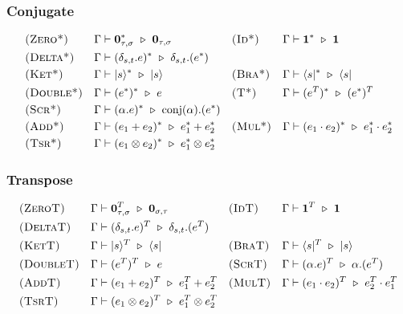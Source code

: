 \subsubsection*{Conjugate}
\begin{align*}
  & \textsc{(Zero*)} && \Gamma \vdash \textbf{0}_{\tau, \sigma}^* \ \triangleright\  \textbf{0}_{\tau, \sigma}
  && \textsc{(Id*)} && \Gamma \vdash \mathbf{1}^* \ \triangleright\  \mathbf{1} \\
  & \textsc{(Delta*)} &&
  \Gamma \vdash (\delta_{s,t}.e)^* \ \triangleright\  \delta_{s,t}.(e^*)\\
  & \textsc{(Ket*)} && \Gamma \vdash |s\rangle^* \ \triangleright\  |s\rangle
  && \textsc{(Bra*)} && \Gamma \vdash \langle s|^* \ \triangleright\  \langle s| \\
  & \textsc{(Double*)} && \Gamma \vdash (e^*)^*\ \triangleright\  e
  && \textsc{(T*)} && \Gamma \vdash (e^T)^* \ \triangleright\ (e^*)^T \\
  & \textsc{(Scr*)} && \Gamma \vdash (\alpha.e)^* \ \triangleright\  \mathrm{conj}(\alpha).(e^*) \\
  & \textsc{(Add*)} && \Gamma \vdash (e_1 + e_2)^* \ \triangleright\  e_1^* + e_2^* 
  && \textsc{(Mul*)} && \Gamma \vdash (e_1 \cdot e_2)^* \ \triangleright\  e_1^* \cdot e_2^* \\
  & \textsc{(Tsr*)} && \Gamma \vdash (e_1 \otimes e_2)^* \ \triangleright\  e_1^* \otimes e_2^*
\end{align*}

\subsubsection*{Transpose}
\begin{align*}
  & \textsc{(ZeroT)} && \Gamma \vdash \textbf{0}_{\tau, \sigma}^T \ \triangleright\  \textbf{0}_{\sigma, \tau}
  && \textsc{(IdT)} && \Gamma \vdash \mathbf{1}^T \ \triangleright\  \mathbf{1} \\
  & \textsc{(DeltaT)} && \Gamma \vdash (\delta_{s,t}.e)^T \ \triangleright\  \delta_{s,t}.(e^T) \\
  & \textsc{(KetT)} && \Gamma \vdash |s\rangle^T \ \triangleright\  \langle s| 
  && \textsc{(BraT)} && \Gamma \vdash \langle s|^T \ \triangleright\  |s\rangle \\
  & \textsc{(DoubleT)} && \Gamma \vdash (e^T)^T \ \triangleright\  e 
  && \textsc{(ScrT)} && \Gamma \vdash (\alpha.e)^T \ \triangleright\  \alpha.(e^T) \\
  & \textsc{(AddT)} && \Gamma \vdash (e_1 + e_2)^T \ \triangleright\  e_1^T + e_2^T
  && \textsc{(MulT)} && \Gamma \vdash (e_1 \cdot e_2)^T \ \triangleright\  e_2^T \cdot e_1^T \\
  & \textsc{(TsrT)} && \Gamma \vdash (e_1 \otimes e_2)^T \ \triangleright\  e_1^T \otimes e_2^T
\end{align*}

